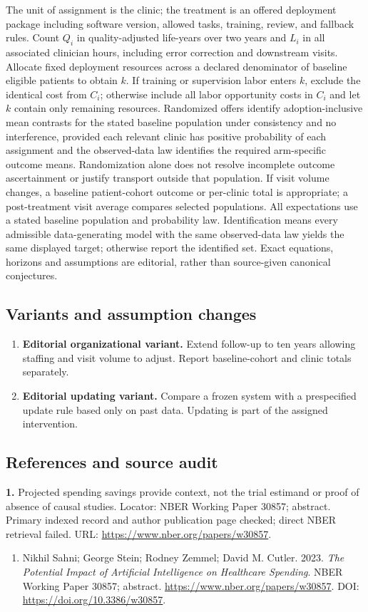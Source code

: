 \documentclass[11pt,a4paper]{article}
\begin{document}
The unit of assignment is the clinic; the treatment is an offered deployment package including software version, allowed tasks, training, review, and fallback rules. Count \(Q_i\) in quality-adjusted life-years over two years and \(L_i\) in all associated clinician hours, including error correction and downstream visits. Allocate fixed deployment resources across a declared denominator of baseline eligible patients to obtain \(k\). If training or supervision labor enters \(k\), exclude the identical cost from \(C_i\); otherwise include all labor opportunity costs in \(C_i\) and let \(k\) contain only remaining resources. Randomized offers identify adoption-inclusive mean contrasts for the stated baseline population under consistency and no interference, provided each relevant clinic has positive probability of each assignment and the observed-data law identifies the required arm-specific outcome means. Randomization alone does not resolve incomplete outcome ascertainment or justify transport outside that population. If visit volume changes, a baseline patient-cohort outcome or per-clinic total is appropriate; a post-treatment visit average compares selected populations. All expectations use a stated baseline population and probability law. Identification means every admissible data-generating model with the same observed-data law yields the same displayed target; otherwise report the identified set. Exact equations, horizons and assumptions are editorial, rather than source-given canonical conjectures.
\subsection*{Variants and assumption changes}
\begin{enumerate}
\item \textbf{Editorial organizational variant.} Extend follow-up to ten years allowing staffing and visit volume to adjust. Report baseline-cohort and clinic totals separately.
\item \textbf{Editorial updating variant.} Compare a frozen system with a prespecified update rule based only on past data. Updating is part of the assigned intervention.
\end{enumerate}
\subsection*{References and source audit}
\textbf{1.} Projected spending savings provide context, not the trial estimand or proof of absence of causal studies. Locator: NBER Working Paper 30857; abstract. Primary indexed record and author publication page checked; direct NBER retrieval failed. URL: \url{https://www.nber.org/papers/w30857}.
\begin{enumerate}\raggedright
\item\hypertarget{definitions:source:30007729:1}{} Nikhil Sahni; George Stein; Rodney Zemmel; David M. Cutler. 2023. \emph{The Potential Impact of Artificial Intelligence on Healthcare Spending}. NBER Working Paper 30857; abstract.
\url{https://www.nber.org/papers/w30857}.
DOI: \url{https://doi.org/10.3386/w30857}.
\end{enumerate}
\end{document}
